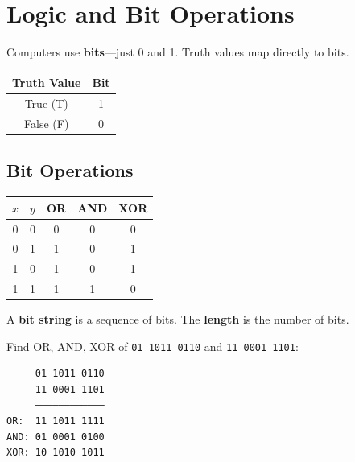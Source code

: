 \documentclass[11pt,a4paper]{article}
\begin{document}
\newpage


\section{Logic and Bit Operations}

Computers use \textbf{bits}---just 0 and 1. Truth values map directly to bits.

\begin{center}
\begin{tabular}{c|c}
\toprule
\textbf{Truth Value} & \textbf{Bit} \\
\midrule
True (T) & 1 \\
False (F) & 0 \\
\bottomrule
\end{tabular}
\end{center}

\subsection{Bit Operations}

\begin{center}
\begin{tabular}{cc|ccc}
\toprule
$x$ & $y$ & OR & AND & XOR \\
\midrule
0 & 0 & 0 & 0 & 0 \\
0 & 1 & 1 & 0 & 1 \\
1 & 0 & 1 & 0 & 1 \\
1 & 1 & 1 & 1 & 0 \\
\bottomrule
\end{tabular}
\end{center}

\begin{definitionbox}
A \textbf{bit string} is a sequence of bits. The \textbf{length} is the number of bits.
\end{definitionbox}

\begin{examplebox}
Find OR, AND, XOR of \texttt{01 1011 0110} and \texttt{11 0001 1101}:

\begin{verbatim}
     01 1011 0110
     11 0001 1101
     ────────────
OR:  11 1011 1111
AND: 01 0001 0100
XOR: 10 1010 1011
\end{verbatim}
\end{examplebox}
\end{document}
